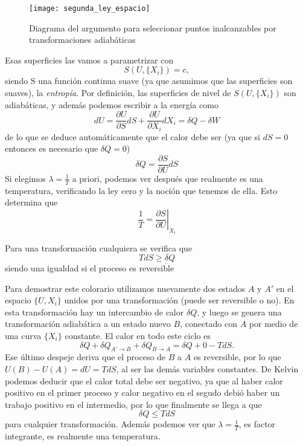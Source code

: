 \begin{figure}[H]
    \centering
    \texttt{[image: segunda\_ley\_espacio]}
    \caption{Diagrama del argumento para seleccionar puntos inalcanzables por transformaciones adiabáticas}
    \label{fig:segunda_ley_espacio}
\end{figure}

Esas superficies las vamos a parametrizar con \[S(U,\{X_i\}) = c,\] siendo S una función continua suave (ya que asumimos que las superficies son suaves), la \emph{entropía}.
Por definición, las superficies de nivel de $S(U,\{X_i\})$ son adiabáticas, y además podemos escribir a la energía como
\[dU = \frac{\partial U}{\partial S} dS + \frac{\partial U}{\partial X_i} dX_i = \delta Q - \delta W\]
de lo que se deduce automáticamente que el calor debe ser (ya que si $dS = 0$ entonces es necesario que $\delta Q = 0$)
\begin{equation}
\delta Q = \frac{\partial S}{\partial U} dS
\end{equation}
Si elegimos $\lambda = \frac{1}{T}$ a priori, podemos ver después que realmente es una temperatura, verificando la ley cero y la noción que tenemos de ella. Esto determina que
\begin{equation}
\frac{1}{T} = \left.\frac{\partial S}{\partial U}\right|_{X_i}
\end{equation}
\begin{collorary}
Para una transformación cualquiera se verifica que \[T dS \geq \delta Q\] siendo una igualdad si el proceso es reversible
\end{collorary}
Para demostrar este colorario utilizamos nuevamente dos estados $A$ y $A'$ en el espacio $\{U,X_i\}$ unidos por una transformación (puede ser reversible o no).
En esta transformación hay un intercambio de calor $\delta Q$, y luego se genera una transformación adiabática a un estado nuevo $B$, conectado con $A$ por medio de una curva $\{X_i\}$ constante.
El calor en todo este ciclo es
\[\delta Q + \delta Q_{A' \to B} + \delta Q_{B \to A} = \delta Q + 0 - T dS.\]
Ese último despeje deriva que el proceso de $B$ a $A$ es reversible, por lo que $U(B) - U(A) = dU = T dS$, al ser las demás variables constantes. De Kelvin podemos deducir que el calor total debe ser negativo, ya que al haber calor positivo en el primer proceso y calor negativo en el segudo debió haber un trabajo positivo en el intermedio, por lo que finalmente se llega a que
\[\delta Q \leq T dS\]
para cualquier transformación.
Además podemos ver que $\lambda = \frac{1}{T}$, es factor integrante, es realmente una temperatura.
